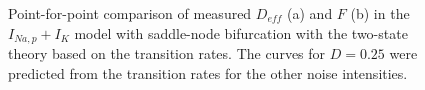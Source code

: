 \documentclass[12pt,a4paper]{article}
\begin{document}
\begin{figure}[H]
	\hspace*{-0.5cm}
	\caption{Point-for-point comparison of measured $D_{eff}$ (a) and $F$ (b) in the $I_{Na,p}+I_K$ model with saddle-node bifurcation with the two-state theory based on the transition rates. The curves for $D=0.25$ were predicted from the transition rates for the other noise intensities.}
\end{figure}
\end{document}
